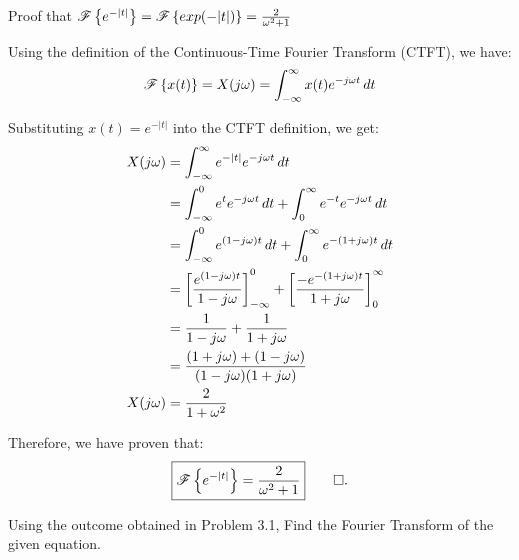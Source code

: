 \documentclass[a4paper, 10pt]{article}
\begin{document}
\newpage

\begin{problem}
\end{problem}

\begin{subproblems}[start=1]
    \item Proof that \( \mathscr{F} \left\{ e^{-|t|} \right\} = \mathscr{F} \left\{ exp(-|t|) \right\} = \frac{2}{\omega^2+1} \)
\end{subproblems}

\begin{solution}
Using the definition of the Continuous-Time Fourier Transform (CTFT), we have:
\[
    \mathscr{F} \left\{ x(t) \right\} = X(j\omega) = \int_{-\infty}^{\infty} x(t) e^{-j\omega t} \,dt
\]

Substituting \( x(t) = e^{-|t|} \) into the CTFT definition, we get:
\begin{align*}  
    X(j\omega) &= \int_{-\infty}^{\infty} e^{-|t|} e^{-j\omega t} \,dt \\
    &= \int_{-\infty}^{0} e^{t} e^{-j\omega t} \,dt + \int_{0}^{\infty} e^{-t} e^{-j\omega t} \,dt \\
    &= \int_{-\infty}^{0} e^{(1 - j\omega) t} \,dt + \int_{0}^{\infty} e^{-(1 + j\omega) t} \,dt \\
    &= \left[ \frac{e^{(1 - j\omega) t}}{1 - j\omega} \right]_{-\infty}^{0} + \left[ \frac{-e^{-(1 + j\omega) t}}{1 + j\omega} \right]_{0}^{\infty} \\
    &= \frac{1}{1 - j\omega} + \frac{1}{1 + j\omega} \\
    &= \frac{(1 + j\omega) + (1 - j\omega)}{(1 - j\omega)(1 + j\omega)} \\
    X(j\omega) &= \frac{2}{1 + \omega^2}
\end{align*}

Therefore, we have proven that:
\[ \boxed{
    \mathscr{F} \left\{ e^{-|t|} \right\} = \frac{2}{\omega^2 + 1}
} \qed. \]
\end{solution}


\begin{subproblems}[start=2]
    \item Using the outcome obtained in Problem 3.1, Find the Fourier Transform of the given equation.
\end{subproblems}
\end{document}
